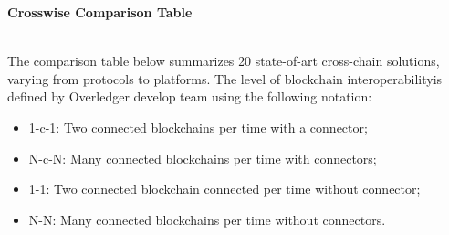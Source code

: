 \begin{huge}
\textbf{Crosswise Comparison Table}
\end{huge}
\\

\noindent The comparison table below summarizes 20 state-of-art cross-chain solutions, varying from protocols to platforms. The level of blockchain interoperability\footnotemark[1] is defined by Overledger develop team using the following notation:
\begin{itemize}
    \item 1-c-1: Two connected blockchains per time with a connector;
    \item N-c-N: Many connected blockchains per time with connectors;
    \item 1-1: Two connected blockchain connected per time without connector;
    \item N-N: Many connected blockchains per time without connectors.
\end{itemize}


 




